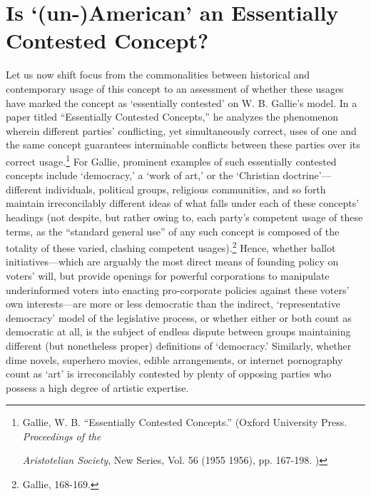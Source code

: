\section{Is `(un-)American' an Essentially Contested
Concept?}\label{is-un-american-an-essentially-contested-concept}

Let us now shift focus from the commonalities between historical and
contemporary usage of this concept to an assessment of whether these
usages have marked the concept as `essentially contested' on W. B.
Gallie's model. In a paper titled ``Essentially Contested Concepts,'' he
analyzes the phenomenon wherein different parties' conflicting, yet
simultaneously correct, uses of one and the same concept guarantees
interminable conflicts between these parties over its correct
usage.\footnote{Gallie, W. B. ``Essentially Contested Concepts.''
  (Oxford University Press. \emph{Proceedings of the }

  \emph{Aristotelian Society}, New Series, Vol. 56 (1955 1956), pp.
  167-198. )} For Gallie, prominent
examples of such essentially contested concepts include `democracy,' a
`work of art,' or the `Christian doctrine'---different individuals,
political groups, religious communities, and so forth maintain
irreconcilably different ideas of what falls under each of these
concepts' headings (not despite, but rather owing to, each party's
competent usage of these terms, as the ``standard general use'' of any
such concept is composed of the totality of these varied, clashing
competent usages).\footnote{Gallie, 168-169.} Hence, whether ballot
initiatives---which are arguably the most direct means of founding
policy on voters' will, but provide openings for powerful corporations
to manipulate underinformed voters into enacting pro-corporate policies
against these voters' own interests---are more or less democratic than
the indirect, `representative democracy' model of the legislative
process, or whether either or both count as democratic at all, is the
subject of endless dispute between groups maintaining different (but
nonetheless proper) definitions of `democracy.' Similarly, whether dime
novels, superhero movies, edible arrangements, or internet pornography
count as `art' is irreconcilably contested by plenty of opposing parties
who possess a high degree of artistic expertise.

